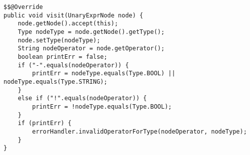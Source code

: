 \begin{lstlisting}[caption={Visit unary expression node}, label={code:TC:Unary}]
$$@Override
public void visit(UnaryExprNode node) {
    node.getNode().accept(this);
    Type nodeType = node.getNode().getType();
    node.setType(nodeType);
    String nodeOperator = node.getOperator();
    boolean printErr = false;
    if ("-".equals(nodeOperator)) {
        printErr = nodeType.equals(Type.BOOL) || nodeType.equals(Type.STRING);
    } 
    else if ("!".equals(nodeOperator)) {
        printErr = !nodeType.equals(Type.BOOL);
    }
    if (printErr) {
        errorHandler.invalidOperatorForType(nodeOperator, nodeType);
    }
}
\end{lstlisting}